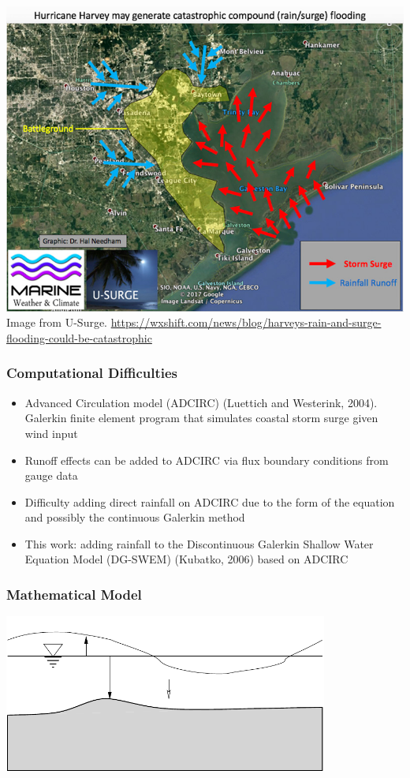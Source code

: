 \documentclass[10pt]{oden_beamer}
\begin{document}
\begin{frame}
  \frametitle{}
  \includegraphics[width=0.9\linewidth]{houston.jpg} \\
  \footnotesize
  Image from U-Surge. \url{https://wxshift.com/news/blog/harveys-rain-and-surge-flooding-could-be-catastrophic}
\end{frame}

\begin{frame}
  \frametitle{Computational Difficulties}
  \begin{itemize}
  \item Advanced Circulation model (ADCIRC) (Luettich and Westerink, 2004). Galerkin finite element program that simulates coastal storm surge given wind input
  \item Runoff effects can be added to ADCIRC via flux boundary conditions from gauge data
  \item Difficulty adding direct rainfall on ADCIRC due to the form of the equation and possibly the continuous Galerkin method
  \item This work: adding rainfall to the Discontinuous Galerkin Shallow Water Equation Model (DG-SWEM) (Kubatko, 2006) based on ADCIRC
  \end{itemize}
\end{frame}

\begin{frame}
  \frametitle{Mathematical Model}
  \centering
  \includegraphics[width=0.8\textwidth]{domain.pdf}
\end{frame}
\end{document}
